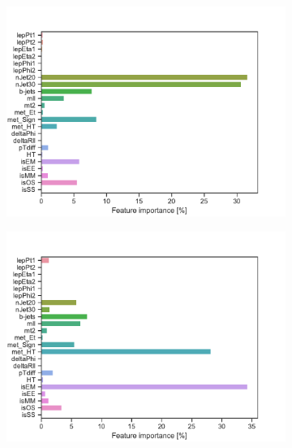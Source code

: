 \begin{figure}[H]
\begin{subfigure}[t!]{0.49\textwidth}
        \includegraphics[width = \textwidth]{Figures/WW/BDT/All_level/Low/featureImportance.pdf}
        \caption{}
        \label{fig:featWWLow}
    \end{subfigure}
    \begin{subfigure}[t!]{0.49\textwidth}
        \includegraphics[width = \textwidth]{Figures/Mono_Z/ML/BDT/All_level/Low/featureImportance.pdf}
        \caption{}
        \label{fig:featMonoZLow}
    \end{subfigure}
    \caption{}
    \label{fig:Non}
\end{figure}

